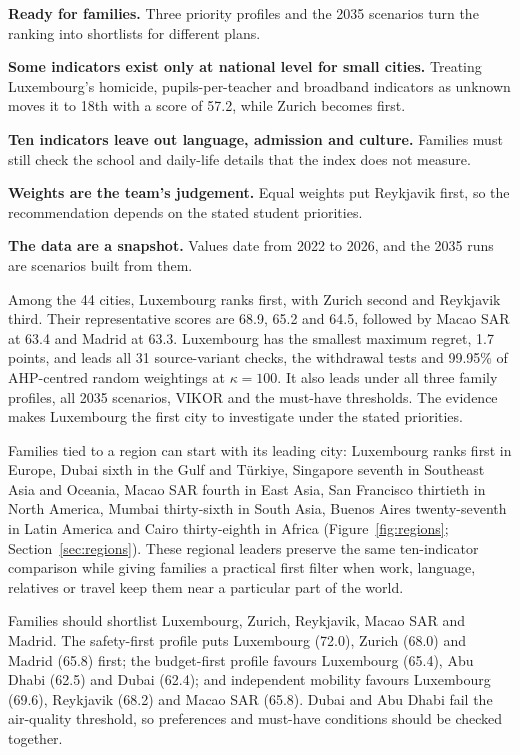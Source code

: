 \documentclass{mcmthesis}
\makeatletter
\newcommand\secstyle[1]{\vbox{\sffamily\Large\bfseries\color{Navy}#1\nointerlineskip\vskip.45ex{\color{Line}\hrule height .7pt}}}
\renewcommand\section{\@startsection{section}{1}{\z@}{-2.6ex \@plus -1ex \@minus -.2ex}{1.2ex \@plus .2ex}{\secstyle}}
\makeatother
\begin{document}
\textbf{Ready for families.} Three priority profiles and the 2035 scenarios
turn the ranking into shortlists for different plans.

\textbf{Some indicators exist only at national level for small cities.}
Treating Luxembourg's homicide, pupils-per-teacher and broadband indicators as
unknown moves it to 18th with a score of 57.2, while Zurich becomes first.

\textbf{Ten indicators leave out language, admission and culture.} Families
must still check the school and daily-life details that the index does not
measure.

\textbf{Weights are the team's judgement.} Equal weights put Reykjavik first,
so the recommendation depends on the stated student priorities.

\textbf{The data are a snapshot.} Values date from 2022 to 2026, and the 2035
runs are scenarios built from them.

\section{Conclusion and decision use}
Among the 44 cities, Luxembourg ranks first, with Zurich second and Reykjavik
third. Their representative scores are 68.9, 65.2 and 64.5, followed by
Macao SAR at 63.4 and Madrid at 63.3. Luxembourg has the smallest maximum
regret, 1.7 points, and leads all 31 source-variant checks, the withdrawal tests
and 99.95\% of AHP-centred random weightings at $\kappa=100$. It also leads
under all three family profiles, all 2035 scenarios, VIKOR and the must-have
thresholds. The evidence makes Luxembourg the first city to investigate under
the stated priorities.

Families tied to a region can start with its leading city: Luxembourg ranks first
in Europe, Dubai sixth in the Gulf and Türkiye, Singapore seventh in Southeast
Asia and Oceania, Macao SAR fourth in East Asia, San Francisco thirtieth in
North America, Mumbai thirty-sixth in South Asia, Buenos Aires twenty-seventh
in Latin America and Cairo thirty-eighth in Africa (Figure~\ref{fig:regions}; Section~\ref{sec:regions}). These
regional leaders preserve the same ten-indicator comparison while giving
families a practical first filter when work, language, relatives or travel keep
them near a particular part of the world.

Families should shortlist Luxembourg, Zurich, Reykjavik, Macao SAR and Madrid.
The safety-first profile puts Luxembourg (72.0), Zurich (68.0) and Madrid (65.8)
first; the budget-first profile favours Luxembourg (65.4), Abu Dhabi (62.5) and
Dubai (62.4); and independent mobility favours Luxembourg (69.6), Reykjavik
(68.2) and Macao SAR (65.8). Dubai and Abu Dhabi fail the air-quality
threshold, so preferences and must-have conditions should be checked together.
\end{document}
